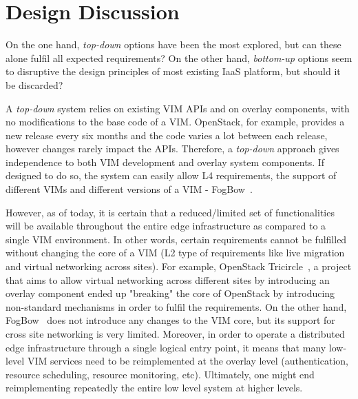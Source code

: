 


\section{Design Discussion}
\label{sec:design_discussion}




On the one hand, \emph{top-down} options have been the most explored, but can these alone fulfil all expected requirements? On the other hand, \emph{bottom-up} options seem to disruptive the design principles of most existing IaaS platform, but should it be discarded?




A \emph{top-down} system  relies on existing VIM APIs and on overlay components, with no modifications to the base code of a VIM.
OpenStack, for example, provides a new release every six months and the code varies a lot between each release, however changes rarely impact the APIs.  Therefore, a \emph{top-down} approach gives independence to both VIM development and overlay system components.
If designed to do so, the system can easily allow L4 requirements, \ie the support of different VIMs and different versions of a VIM - \eg FogBow~\cite{brasileiro2016fogbow}.


However, as of today, it is certain that a reduced/limited set of functionalities will be available throughout the entire edge infrastructure as compared to a single VIM environment. In other words, certain requirements cannot be fulfilled without changing the core of a VIM (\eg L2 type of requirements like live migration and virtual networking across sites). For example, OpenStack Tricircle~\cite{tricircle}, a project that aims to allow virtual networking across different sites by introducing an overlay component ended up "breaking" the core of OpenStack by introducing non-standard mechanisms in order to fulfil the requirements. On the other hand, FogBow~\cite{brasileiro2016fogbow} does not introduce any changes to the VIM core, but its support for cross site networking is very limited.
Moreover, in order to operate a distributed edge infrastructure through a single logical entry point, it means that many low-level VIM services need to be reimplemented at the overlay level (\eg authentication, resource scheduling, resource monitoring, etc). Ultimately, one might end reimplementing repeatedly the entire low level system at higher levels.



